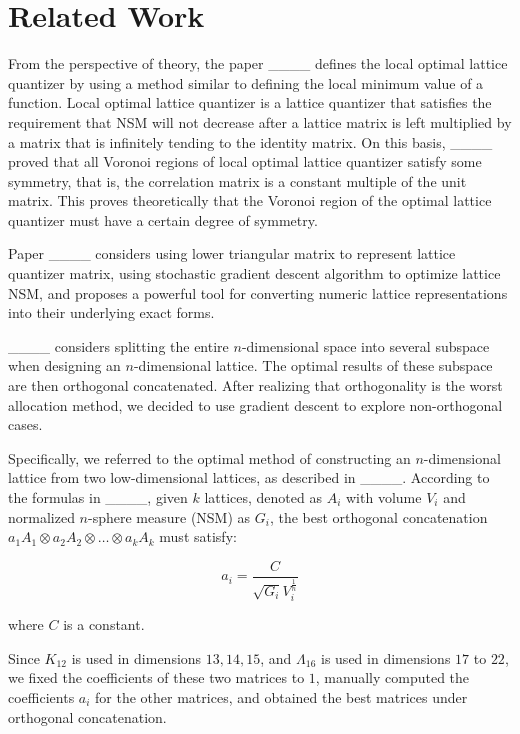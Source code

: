 \section{Related Work}
From the perspective of theory, the paper ____ defines the local optimal lattice quantizer by using a method similar to defining the local minimum value of a function. Local optimal lattice quantizer is a lattice quantizer that satisfies the requirement that NSM will not decrease after a lattice matrix is left multiplied by a matrix that is infinitely tending to the identity matrix. On this basis, ____ proved that all Voronoi regions of local optimal lattice quantizer satisfy some symmetry, that is, the correlation matrix is a constant multiple of the unit matrix. This proves theoretically that the Voronoi region of the optimal lattice quantizer must have a certain degree of symmetry.

Paper ____ considers using lower triangular matrix to represent lattice quantizer matrix, using stochastic gradient descent algorithm to optimize lattice NSM, and proposes a powerful tool for converting numeric lattice representations into their underlying exact forms.

____ considers splitting the entire $n$-dimensional space into several subspace when designing an $n$-dimensional lattice. The optimal results of these subspace are then orthogonal concatenated. After realizing that orthogonality is the worst allocation method, we decided to use gradient descent to explore non-orthogonal cases.

Specifically, we referred to the optimal method of constructing an $n$-dimensional lattice from two low-dimensional lattices, as described in ____. According to the formulas in ____, given $k$ lattices, denoted as $A_i$ with volume $V_i$ and normalized $n$-sphere measure (NSM) as $G_i$, the best orthogonal concatenation $a_1A_1 \otimes a_2A_2 \otimes \dots \otimes a_kA_k$ must satisfy:

\[
a_i = \frac{C}{\sqrt{G_i}V_i^{\frac{1}{n}}}
\]

where $C$ is a constant.

Since $K_{12}$ is used in dimensions $13, 14, 15$, and $\Lambda_{16}$ is used in dimensions $17$ to $22$, we fixed the coefficients of these two matrices to $1$, manually computed the coefficients $a_i$ for the other matrices, and obtained the best matrices under orthogonal concatenation.